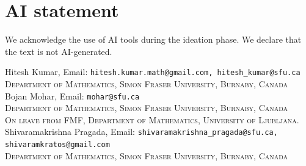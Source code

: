 \documentclass[11pt]{article}
\theoremstyle{plain}
\numberwithin{equation}{section}
\newcommand{\affl}[3]{\noindent #1, Email: {\tt #2}\\ \textsc{#3}\\[1.5pt]}
\begin{document}
\section*{AI statement}
We acknowledge the use of AI tools during the ideation phase. We declare that the text is not AI-generated.




\vspace{0.4cm}

\affl{Hitesh Kumar}{hitesh.kumar.math@gmail.com, hitesh\_kumar@sfu.ca}{Department of Mathematics, Simon Fraser University, Burnaby, Canada}

\affl{Bojan Mohar}{mohar@sfu.ca}{Department of Mathematics, Simon Fraser University, Burnaby, Canada\\On leave from FMF, Department of Mathematics, University of Ljubljana.}
 
\affl{Shivaramakrishna Pragada}{shivaramakrishna\_pragada@sfu.ca, shivaramkratos@gmail.com}{Department of Mathematics, Simon Fraser University, Burnaby, Canada}
\end{document}
